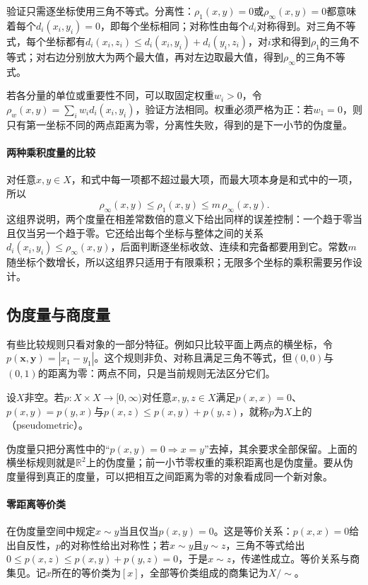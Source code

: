 验证只需逐坐标使用三角不等式。分离性：$\rho_1(x,y)=0$或$\rho_\infty(x,y)=0$都意味着每个$d_i(x_i,y_i)=0$，即每个坐标相同；对称性由每个$d_i$对称得到。对三角不等式，每个坐标都有$d_i(x_i,z_i)\leq d_i(x_i,y_i)+d_i(y_i,z_i)$，对$i$求和得到$\rho_1$的三角不等式；对右边分别放大为两个最大值，再对左边取最大值，得到$\rho_\infty$的三角不等式。

若各分量的单位或重要性不同，可以取固定权重$w_i>0$，令$\rho_w(x,y)=\sum_iw_id_i(x_i,y_i)$，验证方法相同。权重必须严格为正：若$w_1=0$，则只有第一坐标不同的两点距离为零，分离性失败，得到的是下一小节的伪度量。

\paragraph{两种乘积度量的比较}
对任意$x,y\in X$，和式中每一项都不超过最大项，而最大项本身是和式中的一项，所以
\begin{equation}
\label{eq:metric-product-bounds}
  \rho_\infty(x,y)\leq\rho_1(x,y)\leq m\,\rho_\infty(x,y).
\end{equation}
这组界说明，两个度量在相差常数倍的意义下给出同样的误差控制：一个趋于零当且仅当另一个趋于零。它还给出每个坐标与整体之间的关系$d_i(x_i,y_i)\leq\rho_\infty(x,y)$，后面判断逐坐标收敛、连续和完备都要用到它。常数$m$随坐标个数增长，所以这组界只适用于有限乘积；无限多个坐标的乘积需要另作设计。

\subsection{伪度量与商度量}
\label{sec:metric-pseudometric}

有些比较规则只看对象的一部分特征。例如只比较平面上两点的横坐标，令$p(\bm x,\bm y)=|x_1-y_1|$。这个规则非负、对称且满足三角不等式，但$(0,0)$与$(0,1)$的距离为零：两点不同，只是当前规则无法区分它们。

\begin{definition}[伪度量]
\label{def:metric-pseudometric}
设$X$非空。若$p:X\times X\to[0,\infty)$对任意$x,y,z\in X$满足$p(x,x)=0$、$p(x,y)=p(y,x)$与$p(x,z)\leq p(x,y)+p(y,z)$，就称$p$为$X$上的（pseudometric）。
\end{definition}

伪度量只把分离性中的“$p(x,y)=0\Rightarrow x=y$”去掉，其余要求全部保留。上面的横坐标规则就是$\mathbb R^2$上的伪度量；前一小节零权重的乘积距离也是伪度量。要从伪度量得到真正的度量，可以把相互之间距离为零的对象看成同一个新对象。

\paragraph{零距离等价类}
在伪度量空间中规定$x\sim y$当且仅当$p(x,y)=0$。这是等价关系：$p(x,x)=0$给出自反性，$p$的对称性给出对称性；若$x\sim y$且$y\sim z$，三角不等式给出$0\leq p(x,z)\leq p(x,y)+p(y,z)=0$，于是$x\sim z$，传递性成立。等价关系与商集见。记$x$所在的等价类为$[x]$，全部等价类组成的商集记为$X/{\sim}$。


